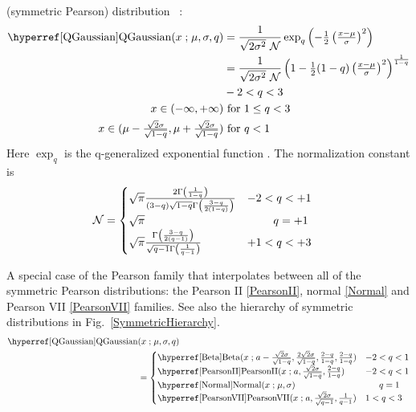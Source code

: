  (symmetric Pearson) distribution~\cite{Leeuwen1995} :
\begin{align}
\label{QGaussian}
\opr{QGaussian}(x\given \mu,\sigma,q) &= \frac{1}{\sqrt{2\sigma^2}  \ \mathcal{N}} \exp_q\left(-\half \left(\tfrac{x-\mu}{\sigma}\right)^2 \right) \checked
\\
 \notag
& = \frac{1}{\sqrt{2\sigma^2} \ \mathcal{N}}  \left(1- \half (1-q) \left(\tfrac{x-\mu}{\sigma}\right)^2 \right)^{\frac{1}{1-q} } \checked
\\
& -2 < q < 3
\notag
\\
x \in (-\infty, +\infty) &\text{ for } 1\leq q < 3
\notag
\\
x \in (\mu-{\tfrac{\sqrt{2}\sigma}{\sqrt{1-q}}}, \mu+{\tfrac{\sqrt{2}\sigma}{\sqrt{1-q}}}) & \text{ for } q < 1
\notag
\end{align}
Here $ \exp_q$ is the q-generalized exponential function . The normalization constant is
\begin{align*}
\mathcal{N} &=
 \begin{cases} 
 \sqrt{\pi} \frac{   {2  \Gamma\left({\frac{1}{1-q}}\right)} }{ {(3-q) \sqrt{1-q} \Gamma\left(\frac{3-q }{ 2(1-q)} \right)}  } 
 & -2 <q < +1 
\\
  \sqrt{\pi} & \phantom{-2<}q=+1  
\\
 \sqrt{\pi}  \frac{{\Gamma\left({\frac{3-q}{2(q-1)}}\right)} }{ {\sqrt{q-1} \Gamma\left(\frac{1 }{ q-1}\right)}}&  +1<q<+3 
\end{cases}
 \end{align*}

A special case of the Pearson family that interpolates between all of the symmetric Pearson distributions: the Pearson II \eqref{PearsonII}, normal \eqref{Normal} and Pearson VII \eqref{PearsonVII} families. See also the hierarchy of symmetric distributions in Fig.~\ref{SymmetricHierarchy}.
\begin{align*}
\opr{QGaussian}&(x\given \mu,\sigma,q) \\ &=
 \begin{cases}
\opr{Beta}(x\given a-\tfrac{\sqrt{2}\sigma}{\sqrt{1-q}},\tfrac{2\sqrt{2}\sigma}{\sqrt{1-q}},\tfrac{2-q}{1-q},\tfrac{2-q}{1-q}) 
 & -2 <q < 1 \checked
 \\
\opr{PearsonII}(x\given a,\tfrac{\sqrt{2}\sigma}{\sqrt{1-q}}, \tfrac{2-q}{1-q}) 
 & -2 <q < 1 \checked
\\
\opr{Normal}(x\given \mu,\sigma)   & \phantom{1<}q=1  \checked
\\
 \opr{PearsonVII}(x\given a,\tfrac{\sqrt{2}\sigma}{\sqrt{q-1}}, \tfrac{1}{q-1}) &  1<q<3 \checked
\end{cases}
 \end{align*}



